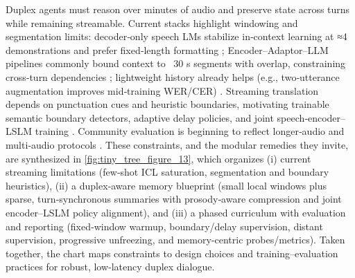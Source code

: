 Duplex agents must reason over minutes of audio and preserve state across turns while remaining streamable. Current stacks highlight windowing and segmentation limits: decoder‑only speech LMs stabilize in‑context learning at ≈4 demonstrations and prefer fixed‑length formatting \cite{hsu2024exploringcontextlearningtextlessspeechla}; Encoder–Adaptor–LLM pipelines commonly bound context to ~30 s segments with overlap, constraining cross‑turn dependencies \cite{nguyen2025qwenvsgemmaintegrationwhispercomparative}; lightweight history already helps (e.g., two‑utterance augmentation improves mid‑training WER/CER) \cite{li2025seewossubmissionmlcslmlessonslearnedspee}. Streaming translation depends on punctuation cues and heuristic boundaries, motivating trainable semantic boundary detectors, adaptive delay policies, and joint speech‑encoder–LSLM training \cite{guo2025streamuniachievingstreamingspeechtransla}. Community evaluation is beginning to reflect longer‑audio and multi‑audio protocols \cite{huang2025dynamicsuperbphase2collaborativelyexpand}. These constraints, and the modular remedies they invite, are synthesized in \autoref{fig:tiny_tree_figure_13}, which organizes (i) current streaming limitations (few‑shot ICL saturation, segmentation and boundary heuristics), (ii) a duplex‑aware memory blueprint (small local windows plus sparse, turn‑synchronous summaries with prosody‑aware compression and joint encoder–LSLM policy alignment), and (iii) a phased curriculum with evaluation and reporting (fixed‑window warmup, boundary/delay supervision, distant supervision, progressive unfreezing, and memory‑centric probes/metrics). Taken together, the chart maps constraints to design choices and training–evaluation practices for robust, low‑latency duplex dialogue.

